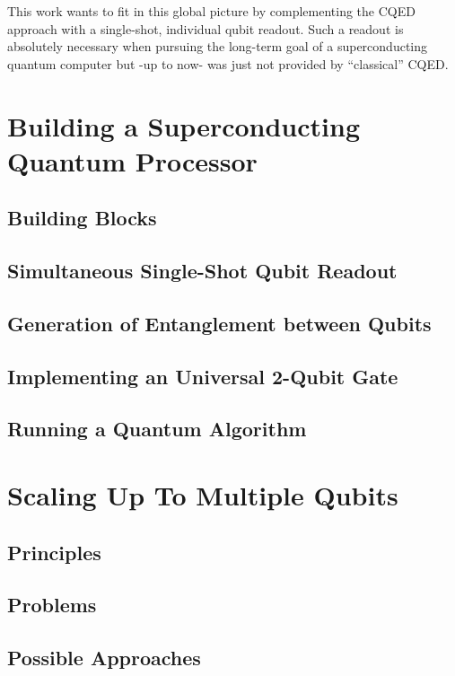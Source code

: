This work wants to fit in this global picture by complementing the CQED approach with a single-shot, individual qubit readout. Such a readout is absolutely necessary when pursuing the long-term goal of a superconducting quantum computer but -up to now- was just not provided by ``classical'' CQED.

\section{Building a Superconducting Quantum Processor}

\subsection{Building Blocks}

\subsection{Simultaneous Single-Shot Qubit Readout}

\subsection{Generation of Entanglement between Qubits}

\subsection{Implementing an Universal 2-Qubit Gate}

\subsection{Running a Quantum Algorithm}

\section{Scaling Up To Multiple Qubits}

\subsection{Principles}

\subsection{Problems}

\subsection{Possible Approaches}

